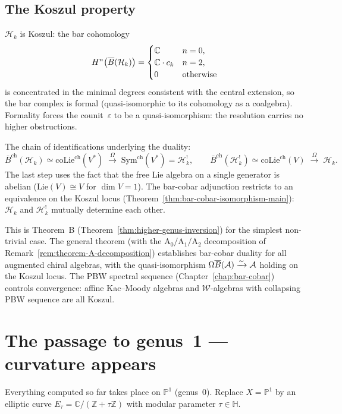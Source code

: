 \subsection{The Koszul property}

$\mathcal{H}_k$ is Koszul: the bar cohomology
\[
H^n\bigl(\overline{B}(\mathcal{H}_k)\bigr) =
\begin{cases}
\mathbb{C} & n = 0, \\
\mathbb{C} \cdot c_k & n = 2, \\
0 & \text{otherwise}
\end{cases}
\]
is concentrated in the minimal degrees consistent with the
central extension, so the bar complex is formal
(quasi-isomorphic to its cohomology as a coalgebra).
Formality forces the counit~$\varepsilon$ to be
a quasi-isomorphism: the resolution carries no higher
obstructions.

The chain of identifications underlying the duality:
\[
\bar{B}^{\mathrm{ch}}(\mathcal{H}_k)
\simeq \mathrm{coLie}^{\mathrm{ch}}(V^*)
\;\xrightarrow{\;\Omega\;}\;
\mathrm{Sym}^{\mathrm{ch}}(V^*)
= \mathcal{H}_k^!,
\qquad
\bar{B}^{\mathrm{ch}}(\mathcal{H}_k^!)
\simeq \mathrm{coLie}^{\mathrm{ch}}(V)
\;\xrightarrow{\;\Omega\;}\;
\mathcal{H}_k.
\]
The last step uses the fact that the free Lie algebra on a single
generator is abelian ($\mathrm{Lie}(V) \cong V$ for
$\dim V = 1$).  The bar-cobar adjunction restricts to an
equivalence on the Koszul locus
(Theorem~\ref{thm:bar-cobar-isomorphism-main}):
$\mathcal{H}_k$ and $\mathcal{H}_k^!$ mutually determine
each other.

This is Theorem~B
(Theorem~\ref{thm:higher-genus-inversion})
for the simplest non-trivial case.  The general theorem
(with the $\mathrm{A}_0/\mathrm{A}_1/\mathrm{A}_2$ decomposition
of Remark~\ref{rem:theorem-A-decomposition}) establishes
bar-cobar duality for all augmented chiral algebras, with the
quasi-isomorphism $\Omega\overline{B}(\mathcal{A}) \xrightarrow{\sim}
\mathcal{A}$ holding on the Koszul locus.  The PBW spectral sequence
(Chapter~\ref{chap:bar-cobar}) controls convergence:
affine Kac--Moody algebras and $\mathcal{W}$-algebras with
collapsing PBW sequence are all Koszul.

\section{The passage to genus~1 --- curvature appears}
\label{sec:frame-genus1}

Everything computed so far takes place on $\mathbb{P}^1$
(genus~$0$).  Replace $X = \mathbb{P}^1$ by an elliptic curve
$E_\tau = \mathbb{C}/(\mathbb{Z} + \tau\mathbb{Z})$ with modular
parameter $\tau \in \mathbb{H}$.

